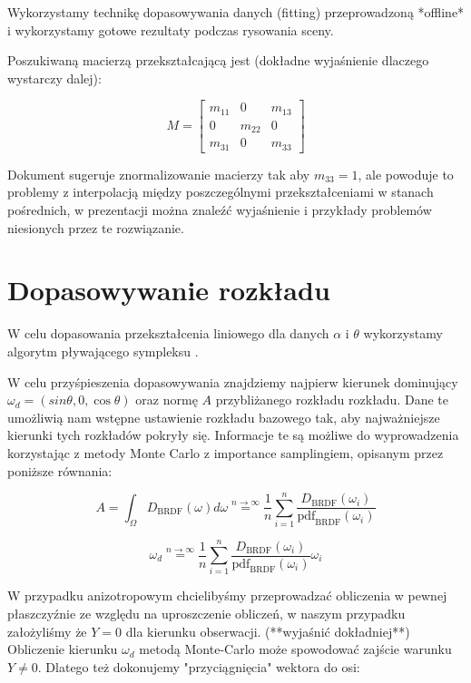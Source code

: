 \documentclass[../main.tex]{subfiles}
\begin{document}
Wykorzystamy technikę dopasowywania danych (fitting) przeprowadzoną
*offline* i wykorzystamy gotowe rezultaty podczas rysowania sceny.

Poszukiwaną macierzą przekształcającą jest (dokładne wyjaśnienie dlaczego
wystarczy dalej):

$$
M =
\begin{bmatrix}
  m_{11} & 0 & m_{13} \\
  0 & m_{22} & 0 \\
  m_{31} & 0 & m_{33}
\end{bmatrix}
$$

Dokument \cite{ltc_heitz} sugeruje znormalizowanie macierzy tak aby $m_{33}=1$,
ale powoduje to problemy z interpolacją między poszczególnymi przekształceniami
w stanach pośrednich, w prezentacji \cite{LTCJourneyPresentation} można znaleźć
wyjaśnienie i przykłady problemów niesionych przez te rozwiązanie.

\section{Dopasowywanie rozkładu}

W celu dopasowania przekształcenia liniowego dla danych $\alpha$
i $\theta$ wykorzystamy algorytm pływającego sympleksu \cite{NelderMead65}.

W celu przyśpieszenia dopasowywania znajdziemy najpierw kierunek dominujący
  $\omega_d = \left(sin\theta, 0, \cos\theta\right)$
oraz normę $A$ przybliżanego rozkładu rozkładu. Dane te umożliwią nam wstępne
ustawienie rozkładu bazowego tak, aby najważniejsze kierunki tych rozkładów
pokryły się. Informacje te są możliwe do wyprowadzenia korzystając z metody
Monte Carlo z importance samplingiem, opisanym przez poniższe równania:

$$
A = \int_{\Omega} D_{\text{BRDF}}(\omega)d\omega
\stackrel{n \rightarrow \infty}{=}
\frac{1}{n} \sum_{i=1}^{n} {
  \frac{
    D_{\text{BRDF}}(\omega_i)
  }{
    \text{pdf}_{\text{BRDF}}(\omega_i)
  }
}
$$

$$
\omega_d
\stackrel{n \rightarrow \infty}{=}
\frac{1}{n} \sum_{i=1}^{n} {
  \frac{
    D_{\text{BRDF}}(\omega_i)
  }{
    \text{pdf}_{\text{BRDF}}(\omega_i)
  }
  \omega_i
}
$$

W przypadku anizotropowym chcielibyśmy przeprowadzać obliczenia w pewnej
płaszczyźnie ze względu na uproszczenie obliczeń, w naszym przypadku
założyliśmy że $Y=0$ dla kierunku obserwacji. (**wyjaśnić dokładniej**)
Obliczenie kierunku $\omega_d$ metodą Monte-Carlo może spowodować zajście
warunku $Y \neq 0$. Dlatego też dokonujemy "przyciągnięcia" wektora do
osi:
\end{document}
